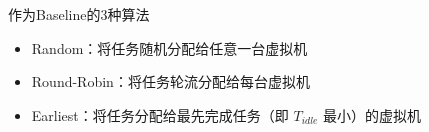 \begin{frame}{作为Baseline的3种算法}

    \begin{itemize}
        \item Random：将任务随机分配给任意一台虚拟机
        \item Round-Robin：将任务轮流分配给每台虚拟机
        \item Earliest：将任务分配给最先完成任务（即 $T_{idle}$ 最小）的虚拟机
    \end{itemize}

\end{frame}
